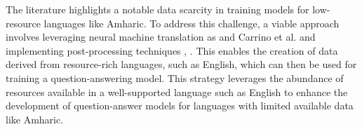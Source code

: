 The literature highlights a notable data scarcity in training models for low-resource languages like Amharic. To address this challenge, a viable approach involves leveraging neural machine translation as \cite{abadani2021parsquad} and Carrino et al. and implementing post-processing techniques \cite{carrino2019automatic}, \cite{abadani2021parsquad}. This enables the creation of data derived from resource-rich languages, such as English, which can then be used for training a question-answering model. This strategy leverages the abundance of resources available in a well-supported language such as English to enhance the development of question-answer models for languages with limited available data like Amharic.
